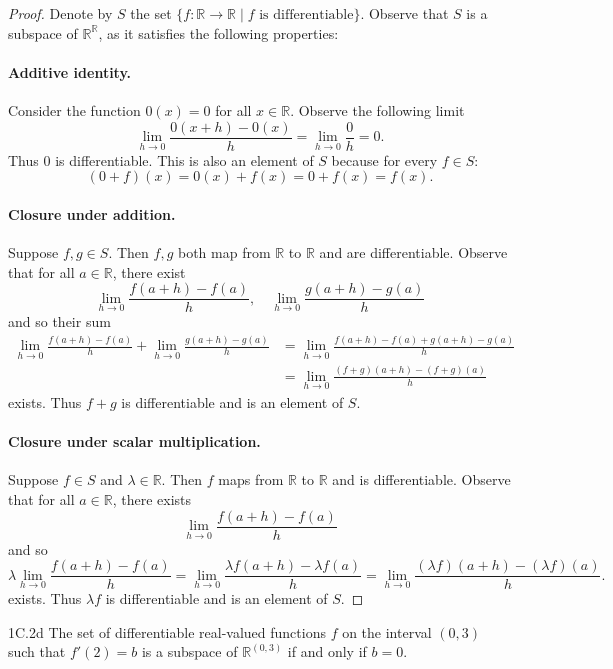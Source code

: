 \documentclass{exam}
\begin{document}
\begin{proof}
    Denote by $S$ the set $\{f:\mathbb R\to\mathbb R\mid f\text{ is differentiable}\}$. Observe that $S$ is a subspace of $\mathbb R^{\mathbb R}$, as it satisfies the following properties:
    \paragraph{Additive identity.} Consider the function $0(x) = 0$ for all $x\in\mathbb R$. Observe the following limit \[
        \lim_{h\to0}\frac{0(x+h) - 0(x)}{h} = \lim_{h\to0}\frac{0}h = 0.
    \]
    Thus $0$ is differentiable. This is also an element of $S$ because for every $f\in S$: \[
        (0 + f)(x) = 0(x) + f(x) = 0 + f(x) = f(x).
    \]

    \paragraph{Closure under addition.} Suppose $f, g\in S$. Then $f, g$ both map from $\mathbb R$ to $\mathbb R$ and are differentiable. Observe that for all $a\in\mathbb R$, there exist \[
        \lim_{h\to0}\frac{f(a + h) - f(a)}{h},\quad\lim_{h\to0}\frac{g(a + h) - g(a)}h
    \]
    and so their sum \begin{align*}
        \lim_{h\to0}\frac{f(a + h) - f(a)}{h} + \lim_{h\to0}\frac{g(a + h) - g(a)}h &= \lim_{h\to0}\frac{f(a + h) - f(a) + g(a + h) - g(a)}{h}\\
        &=\lim_{h\to0}\frac{(f + g)(a + h) - (f + g)(a)}h
    \end{align*}
    exists. Thus $f + g$ is differentiable and is an element of $S$.

    \paragraph{Closure under scalar multiplication.} Suppose $f\in S$ and $\lambda\in\mathbb R$. Then $f$ maps from $\mathbb R$ to $\mathbb R$ and is differentiable. Observe that for all $a\in\mathbb R$, there exists \[
        \lim_{h\to0}\frac{f(a + h) - f(a)}h
    \]
    and so \[
        \lambda\lim_{h\to0}\frac{f(a+h)-f(a)}h = \lim_{h\to0}\frac{\lambda f(a + h) - \lambda f(a)}h = \lim_{h\to0}\frac{(\lambda f)(a + h) - (\lambda f)(a)}h.
    \]
    exists. Thus $\lambda f$ is differentiable and is an element of $S$.
\end{proof}

\begin{problem}{1C.2d}
    The set of differentiable real-valued functions $f$ on the interval $(0, 3)$ such that $f'(2) = b$ is a subspace of $\mathbb R^{(0, 3)}$ if and only if $b = 0$.
\end{problem}
\end{document}
